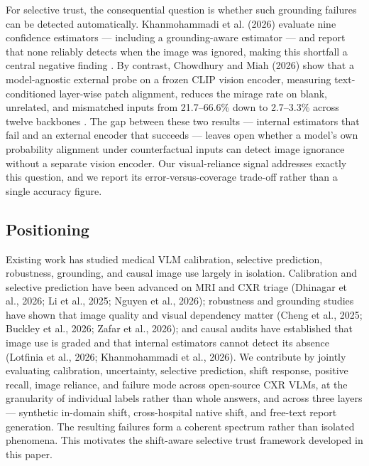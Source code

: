 For selective trust, the consequential question is whether such grounding failures can be detected automatically. Khanmohammadi et al. (2026) evaluate nine confidence estimators --- including a grounding-aware estimator --- and report that none reliably detects when the image was ignored, making this shortfall a central negative finding \citep{khanmohammadi2026calibrated}. By contrast, Chowdhury and Miah (2026) show that a model-agnostic external probe on a frozen CLIP vision encoder, measuring text-conditioned layer-wise patch alignment, reduces the mirage rate on blank, unrelated, and mismatched inputs from 21.7--66.6\% down to 2.7--3.3\% across twelve backbones \citep{chowdhury2026mirage}. The gap between these two results --- internal estimators that fail and an external encoder that succeeds --- leaves open whether a model's own probability alignment under counterfactual inputs can detect image ignorance without a separate vision encoder. Our visual-reliance signal addresses exactly this question, and we report its error-versus-coverage trade-off rather than a single accuracy figure.

\subsection{Positioning}

Existing work has studied medical VLM calibration, selective prediction, robustness, grounding, and causal image use largely in isolation. Calibration and selective prediction have been advanced on MRI and CXR triage (Dhinagar et al., 2026; Li et al., 2025; Nguyen et al., 2026); robustness and grounding studies have shown that image quality and visual dependency matter (Cheng et al., 2025; Buckley et al., 2026; Zafar et al., 2026); and causal audits have established that image use is graded and that internal estimators cannot detect its absence (Lotfinia et al., 2026; Khanmohammadi et al., 2026). We contribute by jointly evaluating calibration, uncertainty, selective prediction, shift response, positive recall, image reliance, and failure mode across open-source CXR VLMs, at the granularity of individual labels rather than whole answers, and across three layers --- synthetic in-domain shift, cross-hospital native shift, and free-text report generation. The resulting failures form a coherent spectrum rather than isolated phenomena. This motivates the shift-aware selective trust framework developed in this paper.